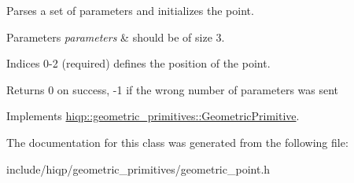 Parses a set of parameters and initializes the point. 


\begin{DoxyParams}{Parameters}
{\em parameters} & should be of size 3. \par
 Indices 0-\/2 (required) defines the position of the point.\\
\hline
\end{DoxyParams}
\begin{DoxyReturn}{Returns}
0 on success, -\/1 if the wrong number of parameters was sent 
\end{DoxyReturn}


Implements \hyperlink{classhiqp_1_1geometric__primitives_1_1GeometricPrimitive_a3697e5afb0121715280da649b8bd711d}{hiqp\-::geometric\-\_\-primitives\-::\-Geometric\-Primitive}.



The documentation for this class was generated from the following file\-:\begin{DoxyCompactItemize}
\item 
include/hiqp/geometric\-\_\-primitives/geometric\-\_\-point.\-h\end{DoxyCompactItemize}
